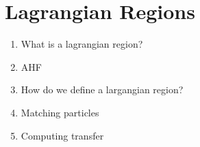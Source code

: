 \section{Lagrangian Regions}

\begin{enumerate}
    \item What is a lagrangian region?
    \item AHF
    \item How do we define a largangian region?
    \item Matching particles
    \item Computing transfer
\end{enumerate}